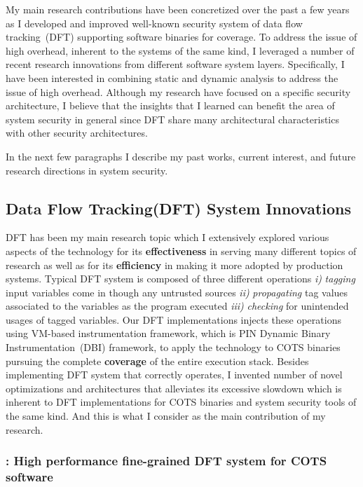\documentclass[letterpaper, 10pt]{article}
\begin{document}
\begin{small}
My main research contributions have been concretized over the past a few years
as I developed and improved well-known security system of data flow
tracking~(DFT) supporting software binaries for coverage.
%
To address the issue of high overhead, inherent to the systems of the same
kind, I leveraged a number of recent research innovations from different
software system layers. Specifically, I have been interested in combining
static and dynamic analysis to address the issue of high overhead.
%
Although my research have focused on a specific security architecture, I
believe that the insights that I learned can benefit the area of system
security in general since DFT share many architectural characteristics with
other security architectures.

In the next few paragraphs I describe my past works, current interest, and
future research directions in system security.

\subsection*{Data Flow Tracking(DFT) System Innovations}
%
DFT has been my main research topic which I extensively explored various
aspects of the technology for its {\bf effectiveness} in serving many different
topics of research as well as for its {\bf efficiency} in making it more
adopted by production systems.
%
Typical DFT system is composed of three different operations {\it i)} {\it
tagging} input variables come in though any untrusted sources {\it ii)} {\it
propagating} tag values associated to the variables as the program executed
{\it iii)} {\it checking} for unintended usages of tagged variables. 
%
Our DFT implementations injects these operations using VM-based instrumentation
framework, which is PIN Dynamic Binary Instrumentation~(DBI) framework, to
apply the technology to COTS binaries pursuing the complete {\bf coverage} of
the entire execution stack.
%
Besides implementing DFT system that correctly operates, I invented number of
novel optimizations and architectures that alleviates its excessive slowdown
which is inherent to DFT implementations for COTS binaries and system security
tools of the same kind. And this is what I consider as the main contribution of
my research.

\subsubsection*{\libdft: High performance fine-grained DFT system for COTS
software}


\end{small}
\end{document}
